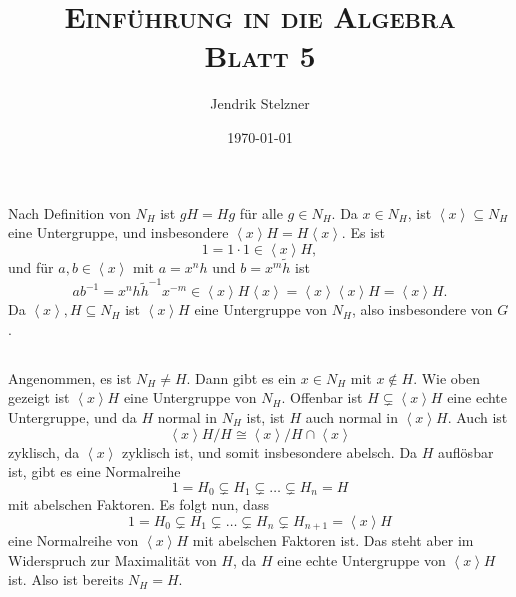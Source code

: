 \documentclass[a4paper,10pt]{article}
\title{\textsc{Einführung in die Algebra \\ \Large Blatt 5}}
\author{Jendrik Stelzner}
\date{\today}
\theoremstyle{definition}
\newcommand{\gen}[1]{\left\langle#1\right\rangle}
\begin{document}
\maketitle





\section{}


\subsection{}
Nach Definition von $N_H$ ist $gH = Hg$ für alle $g \in N_H$. Da $x \in N_H$, ist $\gen{x} \subseteq N_H$ eine Untergruppe, und insbesondere $\gen{x}H = H\gen{x}$.
Es ist
\[
 1 = 1 \cdot 1 \in \gen{x}H,
\]
und für $a,b \in \gen{x}$ mit $a = x^n h$ und $b = x^m \tilde{h}$ ist
\[
 ab^{-1} = x^n h \tilde{h}^{-1} x^{-m} \in \gen{x} H \gen{x} = \gen{x} \gen{x} H = \gen{x} H.
\]
Da $\gen{x}, H \subseteq N_H$ ist $\gen{x}H$ eine Untergruppe von $N_H$, also insbesondere von $G$.


\subsection{}
Angenommen, es ist $N_H \neq H$. Dann gibt es ein $x \in N_H$ mit $x \not\in H$. Wie oben gezeigt ist $\gen{x}H$ eine Untergruppe von $N_H$. Offenbar ist $H \subsetneq \gen{x}H$ eine echte Untergruppe, und da $H$ normal in $N_H$ ist, ist $H$ auch normal in $\gen{x}H$. Auch ist
\[
 \gen{x}\!H/H \cong \gen{x}/H \cap \gen{x}
\]
zyklisch, da $\gen{x}$ zyklisch ist, und somit insbesondere abelsch. Da $H$ auflösbar ist, gibt es eine Normalreihe
\[
 1 = H_0 \subsetneq H_1 \subsetneq \ldots \subsetneq H_n = H
\]
mit abelschen Faktoren. Es folgt nun, dass
\[
 1 = H_0 \subsetneq H_1 \subsetneq \ldots \subsetneq H_n \subsetneq H_{n+1} = \gen{x}H
\]
eine Normalreihe von $\gen{x}H$ mit abelschen Faktoren ist. Das steht aber im Widerspruch zur Maximalität von $H$, da $H$ eine echte Untergruppe von $\gen{x}H$ ist. Also ist bereits $N_H = H$.


\section{}

\subsection{}
\end{document}

